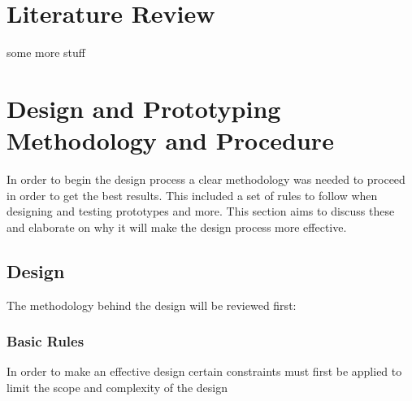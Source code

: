 \documentclass[a4paper,11pt]{article}
\begin{document}
\section{Literature Review}
	some more stuff
	\newpage
	
\section{Design and Prototyping Methodology and Procedure}
	In order to begin the design process a clear methodology was needed to proceed in order to get the best results. This included a set of rules to follow when designing and testing prototypes and more. This section aims to discuss these and elaborate on why it will make the design process more effective. 

\subsection{Design}
The methodology behind the design will be reviewed first:
\subsubsection{Basic Rules}
In order to make an effective design certain constraints must first be applied to limit the scope and complexity of the design 
	 


\end{document}
